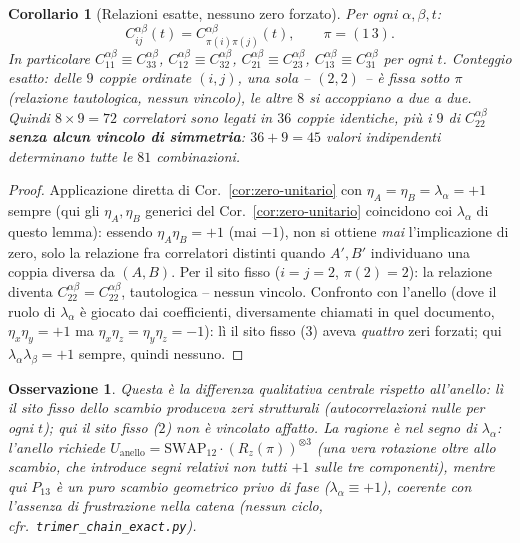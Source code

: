 \documentclass[11pt,a4paper]{article}
\newtheorem{corollario}{Corollario}
\newtheorem{osservazione}{Osservazione}
\begin{document}
\begin{corollario}[Relazioni esatte, nessuno zero forzato]
\label{cor:P13-relazioni}
Per ogni $\alpha,\beta,t$:
\begin{equation}
C_{ij}^{\alpha\beta}(t) = C_{\pi(i)\pi(j)}^{\alpha\beta}(t),\qquad \pi=(1\,3).
\end{equation}
In particolare $C_{11}^{\alpha\beta}\equiv C_{33}^{\alpha\beta}$, $C_{12}^{\alpha\beta}\equiv
C_{32}^{\alpha\beta}$, $C_{21}^{\alpha\beta}\equiv C_{23}^{\alpha\beta}$,
$C_{13}^{\alpha\beta}\equiv C_{31}^{\alpha\beta}$ per ogni $t$. Conteggio esatto: delle $9$ coppie
ordinate $(i,j)$, una sola -- $(2,2)$ -- è fissa sotto $\pi$ (relazione tautologica, nessun
vincolo), le altre $8$ si accoppiano a due a due. Quindi $8\times9=72$ correlatori sono legati in
$36$ coppie identiche, più i $9$ di $C_{22}^{\alpha\beta}$ \textbf{senza alcun vincolo di
simmetria}: $36+9=45$ valori indipendenti determinano tutte le $81$ combinazioni.
\end{corollario}
\begin{proof}
Applicazione diretta di Cor.~\ref{cor:zero-unitario} con $\eta_A=\eta_B=\lambda_\alpha=+1$
sempre (qui gli $\eta_A,\eta_B$ generici del Cor.~\ref{cor:zero-unitario} coincidono coi
$\lambda_\alpha$ di questo lemma): essendo $\eta_A\eta_B=+1$ (mai $-1$), non si ottiene
\emph{mai} l'implicazione di zero, solo la relazione fra correlatori distinti quando $A',B'$
individuano una coppia diversa da $(A,B)$. Per il sito fisso ($i=j=2$, $\pi(2)=2$): la relazione
diventa $C_{22}^{\alpha\beta}=C_{22}^{\alpha\beta}$, tautologica -- nessun vincolo. Confronto con
l'anello (dove il ruolo di $\lambda_\alpha$ è giocato dai coefficienti, diversamente chiamati in
quel documento, $\eta_x\eta_y=+1$ ma $\eta_x\eta_z=\eta_y\eta_z=-1$): lì il sito fisso (3) aveva
\emph{quattro} zeri forzati; qui $\lambda_\alpha\lambda_\beta=+1$ sempre, quindi nessuno.
\end{proof}

\begin{osservazione}
Questa è la differenza qualitativa centrale rispetto all'anello: lì il sito fisso dello scambio
produceva zeri strutturali (autocorrelazioni nulle per ogni $t$); qui il sito fisso ($2$) non è
vincolato affatto. La ragione è nel segno di $\lambda_\alpha$: l'anello richiede
$U_\text{anello}=\mathrm{SWAP}_{12}\cdot(R_z(\pi))^{\otimes3}$ (una vera rotazione oltre allo
scambio, che introduce segni relativi non tutti $+1$ sulle tre componenti), mentre qui $P_{13}$ è
un puro scambio geometrico privo di fase ($\lambda_\alpha\equiv+1$), coerente con l'assenza di
frustrazione nella catena (nessun ciclo, cfr.\ \texttt{trimer\_chain\_exact.py}).
\end{osservazione}
\end{document}
